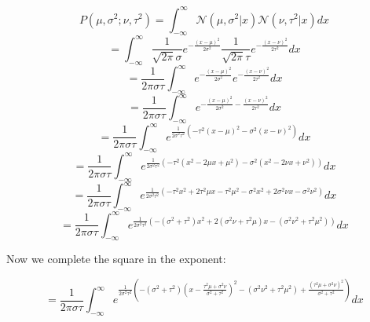 \documentclass{article}
\begin{document}
\begin{equation}
    P(\mu, \sigma^2; \nu, \tau^2) = \int_{-\infty}^\infty \mathcal{N}(\mu, \sigma^2|x) \mathcal{N}(\nu, \tau^2|x) dx
\end{equation}
\begin{equation}
    = \int_{-\infty}^\infty \frac{1}{\sqrt{2\pi}\sigma} e^{-\frac{(x-\mu)^2}{2\sigma^2}} \frac{1}{\sqrt{2\pi}\tau} e^{-\frac{(x-\nu)^2}{2\tau^2}} dx
\end{equation}
\begin{equation}
    = \frac{1}{2\pi\sigma\tau} \int_{-\infty}^\infty e^{-\frac{(x-\mu)^2}{2\sigma^2}} e^{-\frac{(x-\nu)^2}{2\tau^2}} dx
\end{equation}
\begin{equation}
    = \frac{1}{2\pi\sigma\tau} \int_{-\infty}^\infty e^{-\frac{(x-\mu)^2}{2\sigma^2}-\frac{(x-\nu)^2}{2\tau^2}} dx
\end{equation}
\begin{equation}
    = \frac{1}{2\pi\sigma\tau} \int_{-\infty}^\infty e^{\frac{1}{2\sigma^2\tau^2}\left(-\tau^2(x-\mu)^2-\sigma^2(x-\nu)^2\right)} dx
\end{equation}
\begin{equation}
    = \frac{1}{2\pi\sigma\tau} \int_{-\infty}^\infty e^{\frac{1}{2\sigma^2\tau^2}\left(-\tau^2(x^2-2\mu x+\mu^2)-\sigma^2(x^2-2\nu x +\nu^2)\right)} dx
\end{equation}
\begin{equation}
    = \frac{1}{2\pi\sigma\tau} \int_{-\infty}^\infty e^{\frac{1}{2\sigma^2\tau^2}\left(
    -\tau^2 x^2+2\tau^2 \mu x-\tau^2 \mu^2-\sigma^2 x^2+2 \sigma^2 \nu x - \sigma^2 \nu^2 
    \right)} dx
\end{equation}
\begin{equation}
    = \frac{1}{2\pi\sigma\tau} \int_{-\infty}^\infty e^{\frac{1}{2\sigma^2\tau^2} \left(
    -\left( \sigma^2 + \tau^2 \right) x^2
    +2\left( \sigma^2\nu + \tau^2\mu \right) x
    -\left( \sigma^2\nu^2 + \tau^2\mu^2 \right)
    \right)} dx
\end{equation}

Now we complete the square in the exponent:

\begin{equation}
    = \frac{1}{2\pi\sigma\tau} \int_{-\infty}^\infty e^{\frac{1}{2\sigma^2\tau^2} \left(
    -\left(\sigma^2+\tau^2\right)\left(x - \frac{\tau^2 \mu + \sigma^2 \nu}{\sigma^2+\tau^2}\right)^2
    - \left( \sigma^2 \nu^2 + \tau^2 \mu^2 \right)
    + \frac{\left( \tau^2 \mu + \sigma^2 \nu \right)^2}{\sigma^2 + \tau^2}
    \right)} dx
\end{equation}
\end{document}
